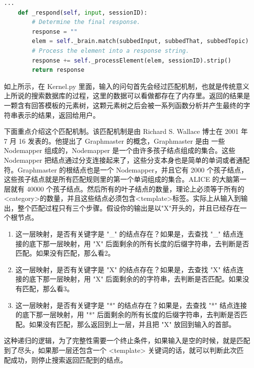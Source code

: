 \documentclass[bachelor,winfonts]{jnuthesis}
\begin{document}
\begin{lstlisting}[language=Python]
    ...
    def _respond(self, input, sessionID):
        # Determine the final response.
        response = ""
        elem = self._brain.match(subbedInput, subbedThat, subbedTopic)
        # Process the element into a response string.
        response += self._processElement(elem, sessionID).strip()
        return response
\end{lstlisting}

如上所示，在 Kernel.py 里面，输入的问句首先会经过匹配机制，也就是传统意义上所说的搜索数据库的过程，这里的数据可以看做都存在了内存里。返回的结果是一颗含有回答模板的元素树，这颗元素树之后会被一系列函数分析并产生最终的字符串表示的结果，返回给用户。

下面重点介绍这个匹配机制\cite{aiml-match-pattern}。该匹配机制是由 Richard S. Wallace 博士在 2001 年 7 月 16 发表的。他提出了 Graphmaster 的概念，Graphmaster 是由 一些 Nodemapper 组成的，Nodemapper 是一个由许多孩子结点组成的集合。这些 Nodemapper 把结点通过分支连接起来了，这些分支本身也是简单的单词或者通配符。Graphmaster 的根结点也是一个 Nodemapper，并且它有 2000 个孩子结点，这些孩子结点就是所有匹配规则里的第一个单词组成的集合。ALICE 的大脑第一层就有 40000 个孩子结点。然后所有的叶子结点的数量，理论上必须等于所有的<category>的数量，并且这些结点必须包含<template>标签。实际上从输入到输出，整个匹配过程只有三个步骤。假设你的输出是以"X"开头的，并且已经存在一个根节点。

\begin{enumerate}
\item 这一层映射，是否有关键字是 "\_" 的结点存在？如果是，去查找 "\_" 结点连接的底下那一层映射，用 "X" 后面剩余的所有长度的后缀字符串，去判断是否匹配。如果没有匹配，那么看2。

\item 这一层映射，是否有关键字是 "X" 的结点存在？如果是，去查找 "X" 结点连接的底下那一层映射，用 "X" 后面剩余的的字符串，去判断是否匹配。如果没有匹配，那么看3。

\item 这一层映射，是否有关键字是 "*" 的结点存在？如果是，去查找 "*" 结点连接的底下那一层映射，用 "*" 后面剩余的所有长度的后缀字符串，去判断是否匹配。如果没有匹配，那么返回到上一层，并且把 "X" 放回到输入的首部。
\end{enumerate}

这种递归的逻辑，为了完整性需要一个终止条件，如果输入是空的时候，就是匹配到了尽头，如果那一层还包含一个 <template> 关键词的话，就可以判断此次匹配成功，则停止搜索返回匹配到的结点。
\end{document}
